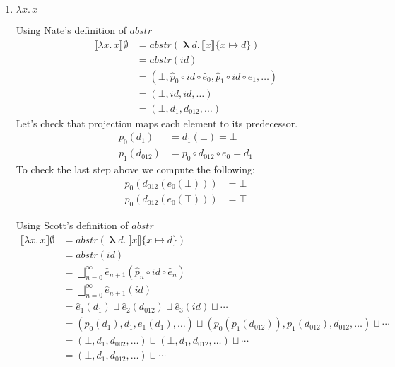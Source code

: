 \documentclass{tufte-handout}
\newcommand{\SEM}[1]{\llbracket #1 \rrbracket}
\newcommand{\LAM}[1]{\lambda #1.\,}
\newcommand{\MLAM}[1]{\boldsymbol\uplambda #1.\,}
\begin{document}
\begin{Answer}
  \begin{enumerate}
  \item $\LAM{x}x$ 
    
    Using Nate's definition of $\mathit{abstr}$
    \begin{align*}
      \SEM{\LAM{x} x}\emptyset &= \mathit{abstr}(\MLAM{d} \SEM{x}\{x\mapsto d\}) \\
      &= \mathit{abstr}(\mathit{id}) \\
      &= (\bot, \hat{p}_0 \circ \mathit{id} \circ \hat{e}_0, \hat{p}_1 \circ \mathit{id} \circ \hat{e}_1, \ldots)\\
      &= (\bot, \mathit{id}, \mathit{id}, \ldots)\\
      &= (\bot, d_1, d_{012}, \ldots) 
    \end{align*}
    Let's check that projection maps each element to its predecessor.
    \begin{align*}
      p_0(d_1) &= d_1(\bot) = \bot \\
      p_1(d_{012}) &= p_0 \circ d_{012} \circ e_0 = d_1 
    \end{align*}
    To check the last step above we compute the following:
    \begin{align*}
    p_0(d_{012} (e_0(\bot))) &= \bot \\
    p_0(d_{012} (e_0(\top))) &= \top
    \end{align*}

    Using Scott's definition of $\mathit{abstr}$
    \begin{align*}
      \SEM{\LAM{x} x}\emptyset &= \mathit{abstr}(\MLAM{d} \SEM{x}\{x\mapsto d\}) \\
      &= \mathit{abstr}(\mathit{id}) \\
      &= \bigsqcup_{n=0}^{\infty} \hat{e}_{n+1}(\hat{p}_n\circ \mathit{id} \circ \hat{e}_n) \\
      &= \bigsqcup_{n=0}^{\infty} \hat{e}_{n+1}(\mathit{id}) \\
      &= \hat{e}_1(d_1) \sqcup \hat{e}_2 (d_{012}) 
      \sqcup \hat{e}_3 (\mathit{id}) 
      \sqcup \cdots \\
      &= (p_0(d_1), d_1, e_1(d_1), \ldots) \sqcup 
         (p_0(p_1(d_{012})), p_1(d_{012}), d_{012}, \ldots) \sqcup \cdots\\
      &= (\bot, d_1, d_{002}, \ldots) \sqcup 
         (\bot, d_1, d_{012}, \ldots) \sqcup \cdots\\
      &= (\bot, d_1, d_{012}, \ldots) \sqcup \cdots
    \end{align*}


\end{enumerate}
\end{Answer}
\end{document}
